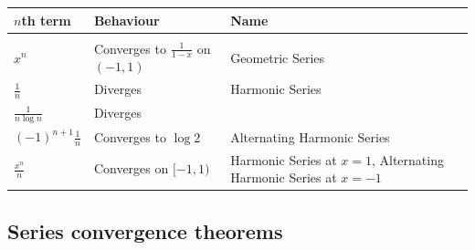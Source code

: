 \begin{tabular}{l|l|l}
  $n$th term             & Behaviour                                   & Name          \\[5pt]
  \hline&&\\
  $x^n$                  & Converges to $\frac{1}{1 - x}$ on $(-1, 1)$ & Geometric Series\\[5pt]
  $\frac{1}{n}$          & Diverges                                    & Harmonic Series \\[5pt]
  $\frac{1}{n\log n}$    & Diverges                                    &                 \\[5pt]
  $(-1)^{n+1}\frac{1}{n}$ & Converges to $\log 2$              & Alternating Harmonic Series \\[5pt]
  $\frac{x^n}{n}$        & Converges on $[-1, 1)$                      & Harmonic Series at $x=1$, Alternating Harmonic Series at $x=-1$\\[5pt]
\end{tabular}


\subsection{Series convergence theorems}


